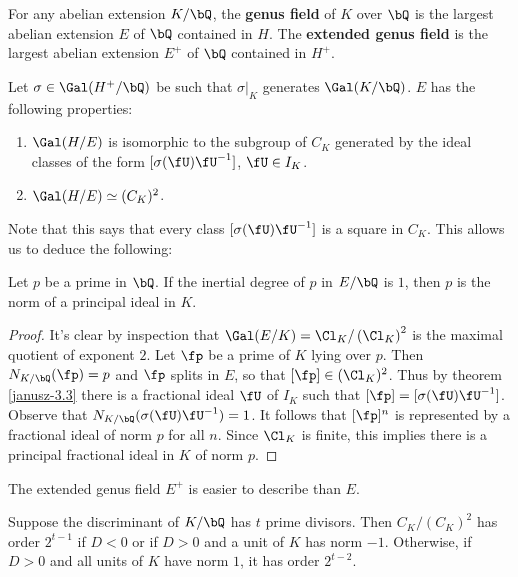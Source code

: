 \begin{defn}
    For any abelian extension $K / \bQ$, the \textbf{genus field} of $K$ over $\bQ$ is the largest abelian extension $E$ of $\bQ$ contained in $H$. The \textbf{extended genus field } is the largest abelian extension $E^{+}$ of $\bQ $ contained in $H^{+}$.
\end{defn}

Let $\sigma \in \Gal(H^{+} / \bQ)$ be such that $\sigma|_{K}$ generates $\Gal(K / \bQ)$. $E$ has the following properties:

\begin{thm}\cite[Chapter VI, Section 3, Theorem 3.3]{Janusz}\label{janusz-3.3}
    \begin{enumerate}
        \item $\Gal(H / E)$ is isomorphic to the subgroup of $C_K$ generated by the ideal classes of the form $[\sigma(\fU)\fU^{-1}]$, $\fU \in I_K$. 
        \item $\Gal(H / E) \simeq (C_K)^2$. 
    \end{enumerate}
\end{thm}

Note that this says that every class $[\sigma(\fU) \fU^{-1}]$ is a square in $C_K$.
This allows us to deduce the following:

\begin{thm}\label{p-principal}
Let $p$ be a prime in $\bQ$. If the inertial degree of $p$ in $E / \bQ$ is $1$, then $p$ is the norm of a principal ideal in $K$. 
\end{thm} 

\begin{proof}
It's clear by inspection that $\Gal(E / K) = \Cl_K / \left(\Cl_K\right)^2$ is the maximal quotient of exponent $2$. Let $\fp$ be a prime of $K$ lying over $p$. Then $N_{K / \bQ}(\fp) = p$ and $\fp$ splits in $E$, so that $[\fp] \in (\Cl_K)^2$. Thus by theorem \ref{janusz-3.3} there is a fractional ideal $\fU$ of $I_K$ such that 
$[\fp] = [\sigma(\fU)\fU^{-1}]$. Observe that $N_{K / \bQ}(\sigma(\fU)\fU^{-1}) = 1$. It follows that $[\fp]^n$ is represented by a fractional ideal of norm $p$ for all $n$. Since $\Cl_K$ is finite, this implies there is a principal fractional ideal in $K$ of norm $p$. 
\end{proof}

The extended genus field $E^{+}$ is easier to describe than $E$.

\begin{thm} 
Suppose the discriminant of $K / \bQ$ has $t$ prime divisors. Then $C_K / (C_K)^2$ has order $2^{t-1}$ if $D < 0$ or if $D > 0$ and a unit of $K$ has norm $-1$. Otherwise, if $D > 0$ and all units of $K$ have norm $1$, it has order $2^{t - 2}$.
\end{thm} 


